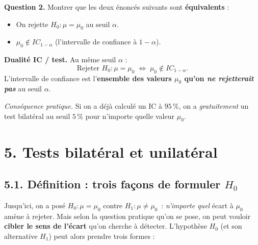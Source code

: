 
\textbf{Question 2.} Montrer que les deux énoncés suivants sont \textbf{équivalents} :
\begin{itemize}
  \item[(a)] On rejette $H_0 : \mu = \mu_0$ au seuil $\alpha$.
  \item[(b)] $\mu_0 \notin IC_{1-\alpha}$ (l'intervalle de confiance à $1-\alpha$).
\end{itemize}


\begin{mdframed}[backgroundcolor=ThemeLight, linecolor=Theme,
  linewidth=1pt, innertopmargin=8pt, innerbottommargin=8pt, nobreak=true]
\textbf{Dualité IC / test.} Au même seuil $\alpha$ :
\[
  \boxed{\;\text{Rejeter } H_0: \mu = \mu_0 \;\Longleftrightarrow\; \mu_0 \notin IC_{1-\alpha}.\;}
\]
L'intervalle de confiance est l'\textbf{ensemble des valeurs $\mu_0$ qu'on \emph{ne rejetterait pas}} au seuil $\alpha$.
\end{mdframed}

\textit{Conséquence pratique.} Si on a déjà calculé un IC à $95\,\%$, on a \emph{gratuitement} un test bilatéral au seuil $5\,\%$ pour n'importe quelle valeur $\mu_0$.

\section*{5. Tests bilatéral et unilatéral}

\subsection*{5.1. Définition : trois façons de formuler $H_0$}

Jusqu'ici, on a posé $H_0 : \mu = \mu_0$ contre $H_1 : \mu \neq \mu_0$~: \emph{n'importe quel} écart à $\mu_0$ amène à rejeter. Mais selon la question pratique qu'on se pose, on peut vouloir \textbf{cibler le sens de l'écart} qu'on cherche à détecter. L'hypothèse $H_0$ (et son alternative $H_1$) peut alors prendre trois formes :


